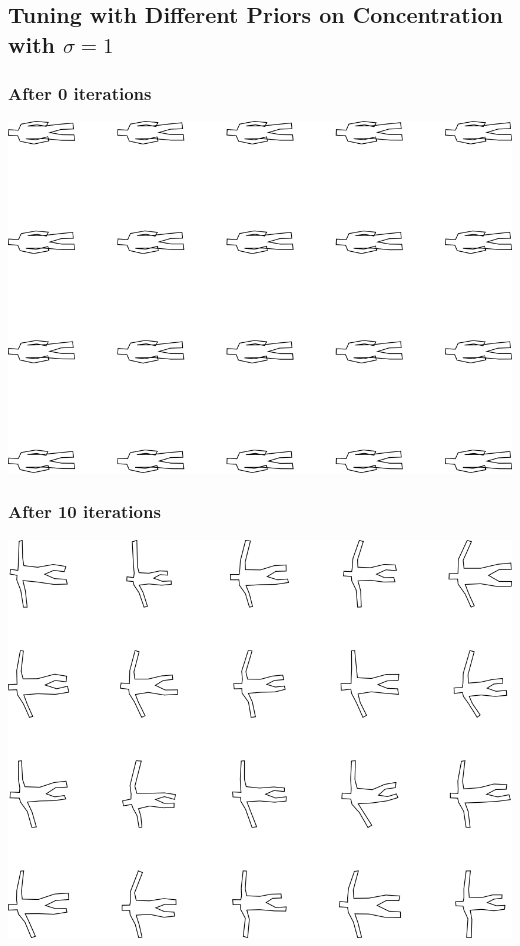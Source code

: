 \subsection{Tuning with Different Priors on Concentration with $\sigma=1$}

\subsubsection{After 0 iterations}

\includegraphics[width=6in]{output/3.learning/concentration/concentration_psw1_iter0_.png}
\subsubsection{After 10 iterations}

\includegraphics[width=6in]{output/3.learning/concentration/concentration_psw1_iter10_.png}
